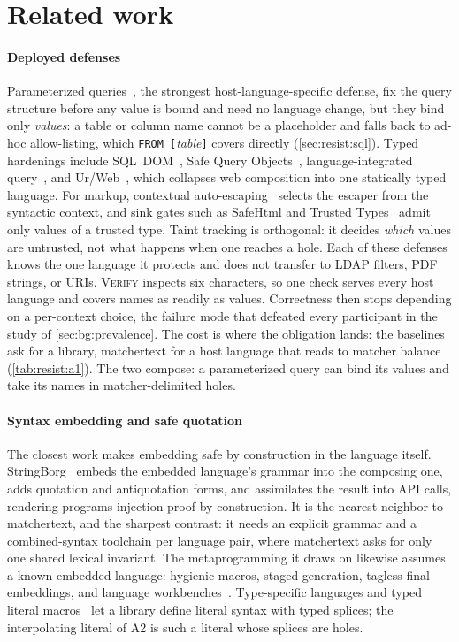 \section{Related work}
\label{sec:related}

\paragraph{Deployed defenses}
Parameterized queries~\cite{owasp_parameterization}, the strongest
host-language-specific defense, fix the query structure before any value is
bound and need no language change, but they bind only \emph{values}: a table or column
name cannot be a placeholder and falls back to ad-hoc allow-listing, which
\verb|FROM [|\textit{table}\verb|]| covers directly (\cref{sec:resist:sql}).
Typed hardenings include SQL~DOM~\cite{mcclure05sqldom}, Safe Query
Objects~\cite{cook05safequery}, language-integrated query~\cite{cheney13liq}, and
Ur/Web~\cite{chlipala15urweb}, which collapses web composition into one
statically typed language. For markup, contextual
auto-escaping~\cite{samuel11csas} selects the escaper from the syntactic
context, and sink gates such as SafeHtml and Trusted
Types~\cite{kern14securing,trustedtypes} admit only values of a trusted type.
Taint tracking is orthogonal: it decides \emph{which} values are untrusted, not
what happens when one reaches a hole.
Each of these defenses knows the one language it protects and does not transfer
to LDAP filters, PDF strings, or URIs. \textsc{Verify} inspects six characters,
so one check serves every host language and covers names as readily as values.
Correctness then stops depending on a per-context choice, the failure mode that
defeated every participant in the study of \cref{sec:bg:prevalence}.
The cost is where the obligation lands: the baselines ask for a library,
matchertext for a host language that reads to matcher balance
(\cref{tab:resist:a1}). The two compose: a parameterized query can bind its
values and take its names in matcher-delimited holes.

\paragraph{Syntax embedding and safe quotation}
The closest work makes embedding safe by construction in the language itself.
StringBorg~\cite{bravenboer10stringborg} embeds the embedded language's grammar
into the composing one, adds quotation and antiquotation forms, and assimilates
the result into API calls, rendering programs injection-proof by construction.
It is the nearest neighbor to matchertext, and the sharpest contrast: it needs an
explicit grammar and a combined-syntax toolchain per language pair, where
matchertext asks for only one shared lexical invariant.
The metaprogramming it draws on likewise assumes a known embedded language:
hygienic macros, staged generation, tagless-final embeddings, and language
workbenches~\cite{kohlbecker86hygienic,dybvig92syntactic,taha00metaml,sheard02template,mainland07quoted,carette09tagless,renggli10embedding}.
Type-specific languages and typed literal macros~\cite{omar14tsl,omar18tlm} let a
library define literal syntax with typed splices; the interpolating literal of A2
is such a literal whose splices are holes.

